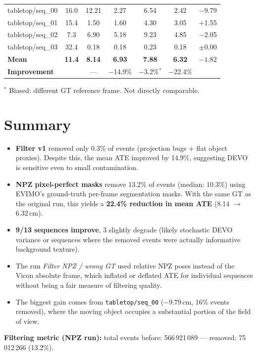 \documentclass[a4paper, 10pt]{article}
\begin{document}
\begin{tabular}{lc|cc|cc|c}
  tabletop/seq\_00 & 16.0 & 12.21 & \cellcolor{best_gold}2.27  & \cellcolor{green_light}6.54  & \cellcolor{green_light}2.42  & $-$9.79 \\
  \rowcolor{row_alt}
  tabletop/seq\_01 & 15.4 & 1.50 & \cellcolor{red_light}1.60  & 4.30  & \cellcolor{red_light}3.05  & $+$1.55 \\
  tabletop/seq\_02 & 7.3  & 6.90 & \cellcolor{green_light}5.18  & 9.23  & \cellcolor{best_gold}4.85  & $-$2.05 \\
  \rowcolor{row_alt}
  tabletop/seq\_03 & 32.4 & 0.18 & \cellcolor{neutral_gray}0.18  & 0.23  & \cellcolor{neutral_gray}0.18  & $\pm$0.00 \\
  \midrule
  \textbf{Mean} & \textbf{11.4} & \textbf{8.14} & \textbf{6.93} & \textbf{7.88} & \textbf{6.32} & $\mathbf{-1.82}$ \\
  \textbf{Improvement} & & --- & $-$14.9\% & $-$3.2\%$^*$ & $\mathbf{-22.4\%}$ & \\
  \bottomrule
\end{tabular}

\vspace{0.4em}
{\small $^*$ Biased: different GT reference frame. Not directly comparable.}

\section*{Summary}

\begin{itemize}
  \item \textbf{Filter v1} removed only 0.3\% of events (projection bugs + flat object proxies). Despite this, the mean ATE improved by 14.9\%, suggesting DEVO is sensitive even to small contamination.

  \item \textbf{NPZ pixel-perfect masks} remove 13.2\% of events (median: 10.3\%) using EVIMO's ground-truth per-frame segmentation masks. With the same GT as the original run, this yields a \textbf{22.4\% reduction in mean ATE} (8.14 $\to$ 6.32\,cm).

  \item \textbf{9/13 sequences improve}, 3 slightly degrade (likely stochastic DEVO variance or sequences where the removed events were actually informative background texture).

  \item The run \emph{Filter NPZ / wrong GT} used relative NPZ poses instead of the Vicon absolute frame, which inflated or deflated ATE for individual sequences without being a fair measure of filtering quality.

  \item The biggest gain comes from \texttt{tabletop/seq\_00} ($-$9.79\,cm, 16\% events removed), where the moving object occupies a substantial portion of the field of view.
\end{itemize}

\vspace{1em}
\noindent\textbf{Filtering metric (NPZ run):} total events before: 566\,921\,089 --- removed: 75\,012\,266 (13.2\%).
\end{document}
